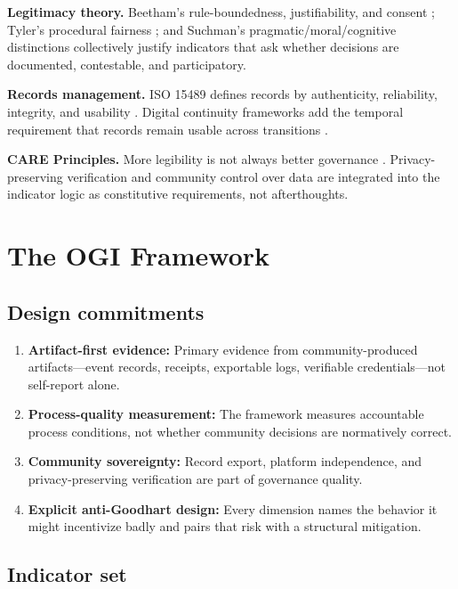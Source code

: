 \documentclass[sigconf,anonymous]{acmart}
\begin{document}
\textbf{Legitimacy theory.} Beetham's rule-boundedness, justifiability, and consent \cite{beetham1991}; Tyler's procedural fairness \cite{tyler2006}; and Suchman's pragmatic/moral/cognitive distinctions \cite{suchman1995} collectively justify indicators that ask whether decisions are documented, contestable, and participatory.

\textbf{Records management.} ISO 15489 defines records by authenticity, reliability, integrity, and usability \cite{iso2016}. Digital continuity frameworks add the temporal requirement that records remain usable across transitions \cite{natarchives2017}.

\textbf{CARE Principles.} More legibility is not always better governance \cite{carroll2020}. Privacy-preserving verification and community control over data are integrated into the indicator logic as constitutive requirements, not afterthoughts.

\section{The OGI Framework}

\subsection{Design commitments}

\begin{enumerate}
\item \textbf{Artifact-first evidence:} Primary evidence from community-produced artifacts---event records, receipts, exportable logs, verifiable credentials---not self-report alone.
\item \textbf{Process-quality measurement:} The framework measures accountable process conditions, not whether community decisions are normatively correct.
\item \textbf{Community sovereignty:} Record export, platform independence, and privacy-preserving verification are part of governance quality.
\item \textbf{Explicit anti-Goodhart design:} Every dimension names the behavior it might incentivize badly and pairs that risk with a structural mitigation.
\end{enumerate}

\subsection{Indicator set}
\end{document}
